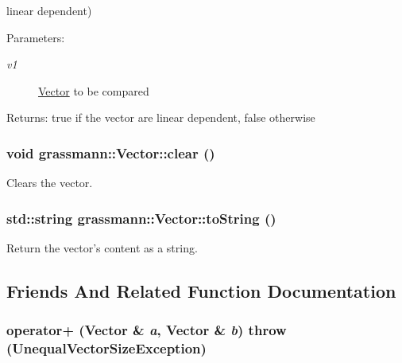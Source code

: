 linear dependent) \begin{Desc}
\item[Parameters:]
\begin{description}
\item[{\em v1}]\hyperlink{classgrassmann_1_1Vector}{Vector} to be compared \end{description}
\end{Desc}
\begin{Desc}
\item[Returns:]true if the vector are linear dependent, false otherwise \end{Desc}
\hypertarget{classgrassmann_1_1Vector_c43808ba1c06b8e502b6a4430c674bd4}{
\subsubsection[clear]{\setlength{\rightskip}{0pt plus 5cm}void grassmann::Vector::clear ()}}
\label{classgrassmann_1_1Vector_c43808ba1c06b8e502b6a4430c674bd4}


Clears the vector. 

\hypertarget{classgrassmann_1_1Vector_2101413da90bea7fd2c911342b48cb60}{
\subsubsection[toString]{\setlength{\rightskip}{0pt plus 5cm}std::string grassmann::Vector::toString ()}}
\label{classgrassmann_1_1Vector_2101413da90bea7fd2c911342b48cb60}


Return the vector's content as a string. 



\subsection{Friends And Related Function Documentation}
\hypertarget{classgrassmann_1_1Vector_802964ed6ee76e3b82662c7b0bfa251a}{
\subsubsection[operator+]{ operator+ ({\bf Vector} \& {\em a}, \/  {\bf Vector} \& {\em b})  throw ({\bf UnequalVectorSizeException})}}
\label{classgrassmann_1_1Vector_802964ed6ee76e3b82662c7b0bfa251a}



